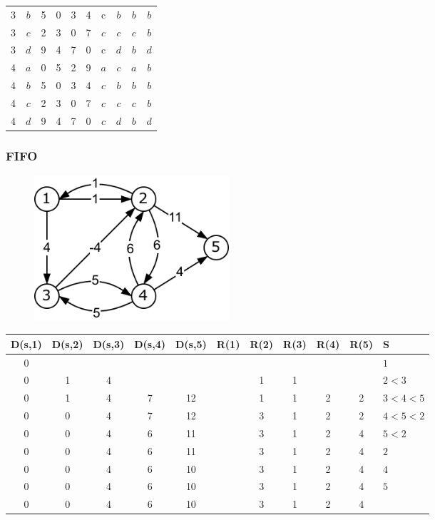 \begin{table}[h]
\begin{tabular}{c|c|cccc|cccc}
3 & $b$ & {\color{blue}5}  & 0 & {\color{red}3} & 4  & {\color{blue}c} & $b$ & $b$ & $b$\\
3 & $c$ & {\color{red}2}  & {\color{red}3} & {\color{red}0} & {\color{red}7}  & {\color{red}$c$} & {\color{red}$c$} & {\color{red}$c$} & {\color{red}$b$}\\
3 & $d$ & {\color{blue}9} & 4 & {\color{red}7} & 0  & {\color{blue}c} & $d$ & $b$ & $d$\\
\hline
4 & $a$ & 0 & 5 & 2 & {\color{red}9} & $a$ & $c$ & $a$ & $b$\\ 
4 & $b$ & 5 & 0 & 3 & {\color{red}4} & $c$ & $b$ & $b$ & $b$\\
4 & $c$ & 2 & 3 & 0 & {\color{red}7} & $c$ & $c$ & $c$ & $b$\\
4 & $d$ & {\color{red}9} & {\color{red}4} & {\color{red}7} & {\color{red}0} & {\color{red}$c$} & {\color{red}$d$} & {\color{red}$b$} & {\color{red}$d$}\\
\end{tabular}
\end{table}

\newpage

\subsubsection*{FIFO}

\begin{figure}[h]
\centering
\includegraphics[width=0.35\textwidth]{graphics/fifo.png}
\end{figure}

\begin{table}[h]
\centering
\begin{tabular}{c|c|c|c|c||c|c|c|c|c||l}
D(s,1) & D(s,2) & D(s,3) & D(s,4) & D(s,5) & R(1) & R(2) & R(3) & R(4) & R(5) & S\\
\hline
0 &   &   &   &    & &   &   &   &   & $1$\\
0 & 1 & 4 &   &    & & 1 & 1 &   &   & $2 < 3$\\
0 & 1 & 4 & 7 & 12 & & 1 & 1 & 2 & 2 & $3 < 4 < 5$\\
0 & 0 & 4 & 7 & 12 & & 3 & 1 & 2 & 2 & $4 < 5 < 2$\\
0 & 0 & 4 & 6 & 11 & & 3 & 1 & 2 & 4 & $5 < 2$\\
0 & 0 & 4 & 6 & 11 & & 3 & 1 & 2 & 4 & $2$\\
0 & 0 & 4 & 6 & 10 & & 3 & 1 & 2 & 4 & $4$\\
0 & 0 & 4 & 6 & 10 & & 3 & 1 & 2 & 4 & $5$\\
0 & 0 & 4 & 6 & 10 & & 3 & 1 & 2 & 4 &
\end{tabular}
\end{table}
